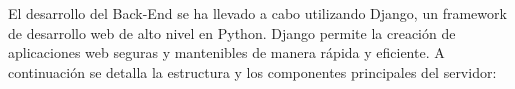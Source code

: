 El desarrollo del Back-End se ha llevado a cabo utilizando Django, un framework de desarrollo web de alto nivel en Python. Django permite la creación de aplicaciones web seguras y mantenibles de manera rápida y eficiente. A continuación se detalla la estructura y los componentes principales del servidor: